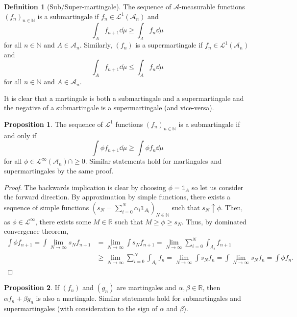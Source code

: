 \documentclass[]{article}
\theoremstyle{definition}
\theoremstyle{definition}
\newtheorem{definition}{Definition}[section]
\newtheorem{proposition}{Proposition}[section]
\begin{document}
\begin{definition}[Sub/Super-martingale]
  The sequence of \(\mathcal{A}\)-measurable functions \((f_n)_{n \in \mathbb{N}}\) 
  is a submartingale if \(f_n \in \mathcal{L}^1(\mathcal{A}_n)\) and 
  \[\int_A f_{n + 1} \dd \mu \ge \int_A f_n \dd \mu\]
  for all \(n \in \mathbb{N}\) and \(A \in \mathcal{A}_n\). Similarly, \((f_n)\) 
  is a supermartingale if \(f_n \in \mathcal{L}^1(\mathcal{A}_n)\) and 
  \[\int_A f_{n + 1} \dd \mu \le \int_A f_n \dd \mu\]
  for all \(n \in \mathbb{N}\) and \(A \in \mathcal{A}_n\).
\end{definition}

It is clear that a martingale is both a submartingale and a supermartingale and 
the negative of a submartingale is a supermartingale (and vice-versa).

\begin{proposition}
  The sequence of \(\mathcal{L}^1\) functions \((f_n)_{n \in \mathbb{N}}\) is a 
  submartingale if and only if 
  \[\int \phi f_{n + 1} \dd \mu \ge \int \phi f_n \dd \mu\]
  for all \(\phi \in \mathcal{L}^\infty(\mathcal{A}_n) \cap \ge 0\). 
  Similar statements hold for martingales and supermartingales by the same proof.
\end{proposition}
\begin{proof}
  The backwards implication is clear by choosing \(\phi = \mathbb{1}_A\) so 
  let us consider the forward direction. By approximation by simple functions, 
  there exists a sequence of simple functions 
  \(\left(s_N = \sum_{i = 0}^N \alpha_i \mathbb{1}_{A_i}\right)_{N \in \mathbb{N}}\) 
  such that \(s_N \uparrow \phi\). Then, as \(\phi \in \mathcal{L}^\infty\), 
  there exists some \(M \in \mathbb{R}\) such that \(M \ge \phi \ge s_N\). 
  Thus, by dominated convergence theorem, 
  \[\begin{split}
    \int \phi f_{n + 1} = \int \lim_{N \to \infty} s_N f_{n + 1} 
    & = \lim_{N \to \infty} \int s_N f_{n + 1} 
      = \lim_{N \to \infty} \sum_{i = 0}^N \int_{A_i} f_{n + 1}\\
    & \ge \lim_{N \to \infty} \sum_{i = 0}^N \int_{A_i} f_n 
      = \lim_{N \to \infty} \int s_N f_n = \int \lim_{N \to \infty} s_N f_n 
      = \int \phi f_n.
    \end{split}\] 
\end{proof}

\begin{proposition}
  If \((f_n)\) and \((g_n)\) are martingales and \(\alpha, \beta \in \mathbb{R}\),
  then \(\alpha f_n + \beta g_n\) is also a martingale. Similar statements 
  hold for submartingales and supermartingales (with consideration to the  
  sign of \(\alpha\) and \(\beta\)).
\end{proposition}
\end{document}
